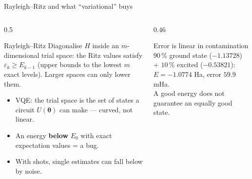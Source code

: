\documentclass[aspectratio=169,11pt]{beamer}
\newcommand{\hl}[1]{{\color{qorange}\textbf{#1}}}
\newcommand{\bt}{\boldsymbol\theta}
\begin{document}
\begin{frame}{Rayleigh--Ritz and what ``variational'' buys}
  \begin{columns}[T]
    \begin{column}{0.5\textwidth}
      \begin{block}{Rayleigh--Ritz}
        Diagonalise $H$ inside an $m$-dimensional trial space: the Ritz values satisfy $\varepsilon_k \ge E_{k-1}$ (upper bounds to the lowest
        $m$ exact levels). Larger spaces can only lower them.
      \end{block}
      \begin{itemize}
        \item VQE: the trial space is the set of states a circuit $U(\bt)$ can make --- curved, not linear.
        \item An energy \hl{below} $E_0$ with exact expectation values = a bug.
        \item With shots, single estimates can fall below by noise.
      \end{itemize}
    \end{column}
    \begin{column}{0.46\textwidth}
      \begin{alertblock}{Error is linear in contamination}
        $90\,\%$ ground state ($-1.13728$) + $10\,\%$ excited ($-0.53821$): $E = -1.0774$ Ha, error $59.9$ mHa.\\
        A good energy does not guarantee an equally good state.
      \end{alertblock}
    \end{column}
  \end{columns}
\end{frame}
\end{document}
